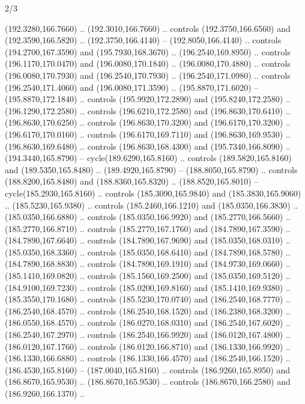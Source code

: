 \begin{flagdescription}{2/3}
\begin{scope}[xshift=0.5\flaglength,yshift=0.5\flagwidth,scale=\flagwidth/259.2]
\begin{scope}[y=0.8pt, x=0.8pt, yscale=-1,shift={(-243,-162)}]
      (192.3280,166.7660) .. (192.3010,166.7660) .. controls (192.3750,166.6560) and
      (192.3590,166.5820) .. (192.3750,166.4140) -- (192.8050,166.4140) .. controls
      (194.2700,167.3590) and (195.7930,168.3670) .. (196.2540,169.8950) .. controls
      (196.1170,170.0470) and (196.0080,170.1840) .. (196.0080,170.4880) .. controls
      (196.0080,170.7930) and (196.2540,170.7930) .. (196.2540,171.0980) .. controls
      (196.2540,171.4060) and (196.0080,171.3590) .. (195.8870,171.6020) --
      (195.8870,172.1840) .. controls (195.9920,172.2890) and (195.8240,172.2580) ..
      (196.1290,172.2580) .. controls (196.6210,172.2580) and (196.8630,170.6410) ..
      (196.8630,170.6250) .. controls (196.8630,170.3200) and (196.6170,170.3200) ..
      (196.6170,170.0160) .. controls (196.6170,169.7110) and (196.8630,169.9530) ..
      (196.8630,169.6480) .. controls (196.8630,168.4300) and (195.7340,166.8090) ..
      (194.3440,165.8790) -- cycle(189.6290,165.8160) .. controls
      (189.5820,165.8160) and (189.5350,165.8480) .. (189.4920,165.8790) --
      (188.8050,165.8790) .. controls (188.8200,165.8480) and (188.8360,165.8320) ..
      (188.8520,165.8010) -- cycle(185.2930,165.8160) .. controls
      (185.3090,165.9840) and (185.3830,165.9060) .. (185.5230,165.9380) .. controls
      (185.2460,166.1210) and (185.0350,166.3830) .. (185.0350,166.6880) .. controls
      (185.0350,166.9920) and (185.2770,166.5660) .. (185.2770,166.8710) .. controls
      (185.2770,167.1760) and (184.7890,167.3590) .. (184.7890,167.6640) .. controls
      (184.7890,167.9690) and (185.0350,168.0310) .. (185.0350,168.3360) .. controls
      (185.0350,168.6410) and (184.7890,168.5780) .. (184.7890,168.8830) .. controls
      (184.7890,169.1910) and (184.9730,169.0660) .. (185.1410,169.0820) .. controls
      (185.1560,169.2500) and (185.0350,169.5120) .. (184.9100,169.7230) .. controls
      (185.0200,169.8160) and (185.1410,169.9380) .. (185.3550,170.1680) .. controls
      (185.5230,170.0740) and (186.2540,168.7770) .. (186.2540,168.4570) .. controls
      (186.2540,168.1520) and (186.2380,168.3200) .. (186.0550,168.4570) .. controls
      (186.0270,168.0310) and (186.2540,167.6020) .. (186.2540,167.2970) .. controls
      (186.2540,166.9920) and (186.0120,167.4800) .. (186.0120,167.1760) .. controls
      (186.0120,166.8710) and (186.1330,166.9920) .. (186.1330,166.6880) .. controls
      (186.1330,166.4570) and (186.2540,166.1520) .. (186.4530,165.8160) --
      (187.0040,165.8160) .. controls (186.9260,165.8950) and (186.8670,165.9530) ..
      (186.8670,165.9530) .. controls (186.8670,166.2580) and (186.9260,166.1370) ..

\end{scope}
\end{scope}
\end{flagdescription}
